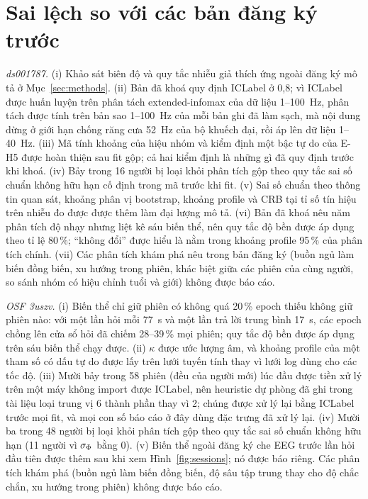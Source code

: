 \appendices

\section{Sai lệch so với các bản đăng ký trước}
\label{app:deviations}
\textit{ds001787.} (i) Khảo sát biên độ và quy tắc nhiễu giả thích ứng ngoài đăng ký mô tả ở Mục~\ref{sec:methods}. (ii) Bản đã khoá quy định ICLabel ở 0,8; vì ICLabel được huấn luyện trên phân tách extended-infomax của dữ liệu 1--100~Hz, phân tách được tính trên bản sao 1--100~Hz của mỗi bản ghi đã làm sạch, mà nội dung dừng ở giới hạn chống răng cưa 52~Hz của bộ khuếch đại, rồi áp lên dữ liệu 1--40~Hz. (iii) Mã tính khoảng của hiệu nhóm và kiểm định một bậc tự do của E-H5 được hoàn thiện sau fit gộp; cả hai kiểm định là những gì đã quy định trước khi khoá. (iv) Bảy trong 16 người bị loại khỏi phân tích gộp theo quy tắc sai số chuẩn không hữu hạn cố định trong mã trước khi fit. (v) Sai số chuẩn theo thông tin quan sát, khoảng phân vị bootstrap, khoảng profile và CRB tại tỉ số tín hiệu trên nhiễu đo được được thêm làm đại lượng mô tả. (vi) Bản đã khoá nêu năm phân tích độ nhạy nhưng liệt kê sáu biến thể, nên quy tắc độ bền được áp dụng theo tỉ lệ 80\,\%; ``không đổi'' được hiểu là nằm trong khoảng profile 95\,\% của phân tích chính. (vii) Các phân tích khám phá nêu trong bản đăng ký (buồn ngủ làm biến đồng biến, xu hướng trong phiên, khác biệt giữa các phiên của cùng người, so sánh nhóm có hiệu chỉnh tuổi và giới) không được báo cáo.

\textit{OSF 3uszv.} (i) Biến thể chỉ giữ phiên có không quá 20\,\% epoch thiếu không giữ phiên nào: với một lần hỏi mỗi 77~s và một lần trả lời trung bình 17~s, các epoch chồng lên cửa sổ hỏi đã chiếm 28--39\,\% mọi phiên; quy tắc độ bền được áp dụng trên sáu biến thể chạy được. (ii) $\kappa$ được ước lượng âm, và khoảng profile của một tham số có dấu tự do được lấy trên lưới tuyến tính thay vì lưới log dùng cho các tốc độ. (iii) Mười bảy trong 58 phiên (đều của người mới) lúc đầu được tiền xử lý trên một máy không import được ICLabel, nên heuristic dự phòng đã ghi trong tài liệu loại trung vị 6 thành phần thay vì 2; chúng được xử lý lại bằng ICLabel trước mọi fit, và mọi con số báo cáo ở đây dùng đặc trưng đã xử lý lại. (iv) Mười ba trong 48 người bị loại khỏi phân tích gộp theo quy tắc sai số chuẩn không hữu hạn (11 người vì $\sigma_{\Phi}$ bằng 0). (v) Biến thể ngoài đăng ký che EEG trước lần hỏi đầu tiên được thêm sau khi xem Hình~\ref{fig:sessions}; nó được báo riêng. Các phân tích khám phá (buồn ngủ làm biến đồng biến, độ sâu tập trung thay cho độ chắc chắn, xu hướng trong phiên) không được báo cáo.

